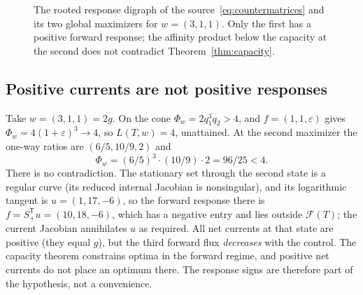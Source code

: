 \documentclass[11pt,a4paper]{article}
\theoremstyle{plain}
\theoremstyle{definition}
\theoremstyle{remark}
\numberwithin{equation}{section}
\newcommand{\T}{\mathsf{T}}
\newcommand{\Sp}{S_{+}}
\newcommand{\cone}{\mathcal{F}}
\newcommand{\eps}{\varepsilon}
\begin{document}
\begin{figure}[t]
\centering
{}
\caption{The rooted response digraph of the source~\eqref{eq:countermatrices} and its two global maximizers for $w=(3,1,1)$. Only the first has a positive forward response; the affinity product below the capacity at the second does not contradict Theorem~\ref{thm:capacity}.}
\label{fig:rooted}
\end{figure}

\subsection{Positive currents are not positive responses}
Take $w=(3,1,1)=2g$. On the cone $\Phi_w=2q_1^3q_2>4$, and $f=(1,1,\eps)$ gives $\Phi_w=4(1+\eps)^3\to4$, so $L(T,w)=4$, unattained. At the second maximizer the one-way ratios are $(6/5,10/9,2)$ and
\[
 \Phi_w=(6/5)^3\cdot(10/9)\cdot2=96/25<4 .
\]
There is no contradiction. The stationary set through the second state is a regular curve (its reduced internal Jacobian is nonsingular), and its logarithmic tangent is $u=(1,17,-6)$, so the forward response there is $f=\Sp^{\T}u=(10,18,-6)$, which has a negative entry and lies outside $\cone(T)$; the current Jacobian annihilates $u$ as required. All net currents at that state are positive (they equal $g$), but the third forward flux \emph{decreases} with the control. The capacity theorem constrains optima in the forward regime, and positive net currents do not place an optimum there. The response signs are therefore part of the hypothesis, not a convenience.
\end{document}
